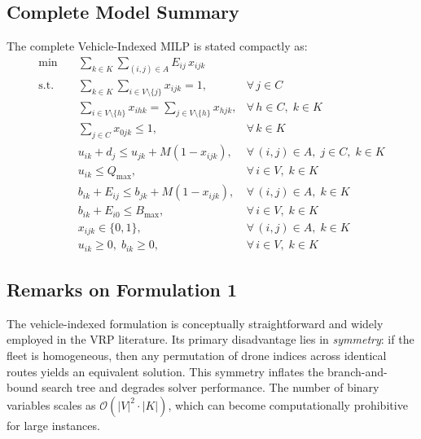 \documentclass[11pt,a4paper]{article}
\begin{document}
\subsection{Complete Model Summary}

The complete Vehicle-Indexed MILP is stated compactly as:
\begin{align}
  \min \quad & \sum_{k \in K} \sum_{(i,j) \in A} E_{ij} \, x_{ijk} \label{eq:f1_full_obj}\\[6pt]
  \text{s.t.} \quad & \sum_{k \in K} \sum_{i \in V \setminus \{j\}} x_{ijk} = 1, & \forall\, j \in C \label{eq:f1_full_visit}\\
  & \sum_{i \in V \setminus \{h\}} x_{ihk} = \sum_{j \in V \setminus \{h\}} x_{hjk}, & \forall\, h \in C,\; k \in K \label{eq:f1_full_flow}\\
  & \sum_{j \in C} x_{0jk} \le 1, & \forall\, k \in K \label{eq:f1_full_depot}\\
  & u_{ik} + d_j \le u_{jk} + M(1 - x_{ijk}), & \forall\, (i,j) \in A,\; j \in C,\; k \in K \label{eq:f1_full_mtz}\\
  & u_{ik} \le Q_{\max}, & \forall\, i \in V,\; k \in K \label{eq:f1_full_cap}\\
  & b_{ik} + E_{ij} \le b_{jk} + M(1 - x_{ijk}), & \forall\, (i,j) \in A,\; k \in K \label{eq:f1_full_energy}\\
  & b_{ik} + E_{i0} \le B_{\max}, & \forall\, i \in V,\; k \in K \label{eq:f1_full_battery}\\
  & x_{ijk} \in \{0, 1\}, & \forall\, (i,j) \in A,\; k \in K \label{eq:f1_full_bin}\\
  & u_{ik} \ge 0,\; b_{ik} \ge 0, & \forall\, i \in V,\; k \in K \label{eq:f1_full_cont}
\end{align}

\subsection{Remarks on Formulation 1}

The vehicle-indexed formulation is conceptually straightforward and widely employed in the VRP literature. Its primary disadvantage lies in \emph{symmetry}: if the fleet is homogeneous, then any permutation of drone indices across identical routes yields an equivalent solution. This symmetry inflates the branch-and-bound search tree and degrades solver performance. The number of binary variables scales as $\mathcal{O}(|V|^2 \cdot |K|)$, which can become computationally prohibitive for large instances.
\end{document}
